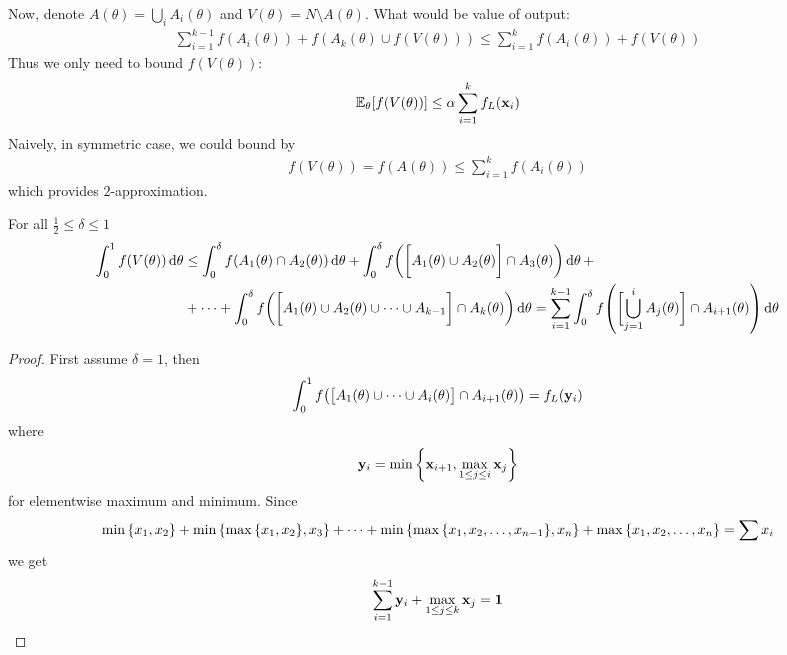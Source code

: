 Now, denote $A(\theta) = \bigcup_i A_i(\theta)$ and $V(\theta) = N \setminus A(\theta)$. What would be value of output:
\begin{align}
\sum_{i=1}^{k-1} f(A_i(\theta)) + f(A_k(\theta) \cup f(V(\theta))) \leq \sum_{i=1}^k f(A_i(\theta)) + f(V(\theta))
\end{align}
Thus we only need to bound $f(V(\theta))$:
\begin{align}
\mathbb{E}_\theta [f(V(\theta))] \leq \alpha \sum_{i=1}^{k} f_L(\vb{x}_i) 
\end{align}
Naively, in symmetric case, we could bound by
\begin{align}
f(V(\theta)) = f(A(\theta)) \leq \sum_{i=1}^{k} f(A_i(\theta))  
\end{align}
which provides $2$-approximation.
\begin{lemma}\label{th:delta_lemma}
	For all $\frac{1}{2} \leq \delta \leq 1$
	\begin{align}
	\int_0^1 f(V(\theta)) \dd{\theta} &\leq \int_0^\delta f(A_1(\theta) \cap A_2(\theta)) \dd{\theta} + \int_0^\delta f\qty(\qty\bigg[A_1(\theta) \cup A_2(\theta)] \cap A_3(\theta)) \dd{\theta} +\\&+ \dots + \int_0^\delta f\qty(\qty\bigg[A_1(\theta) \cup A_2(\theta) \cup \dots \cup A_{k-1}] \cap A_k(\theta)) \dd{\theta} = \sum_{i=1}^{k-1} \int_0^\delta f\qty(\qty\bigg[ \bigcup_{j=1}^{i} A_j(\theta)] \cap A_{i+1}(\theta)) \dd{\theta} 
	\end{align}
	\begin{proof}
		First assume $\delta=1$, then
		\begin{align}
		\int_0^1 f\qty(\qty\big[A_1(\theta) \cup \dots \cup A_{i}(\theta)] \cap A_{i+1}(\theta)) = f_L(\vb{y}_i)
		\end{align}
		where
		\begin{align}
		\vb{y}_i = \min \qty{\vb{x}_{i+1},\max\limits_{1\leq j \leq i} \vb{x}_j  }
		\end{align}
		for elementwise maximum and minimum. Since
		\begin{align}
		\min\qty{x_1, x_2} + \min\qty{\max\qty{x_1, x_2} , x_3} +\dots + \min\qty{\max\qty{x_1, x_2, \dots, x_{n-1}} , x_n} +\max\qty{x_1, x_2, \dots, x_{n}} = \sum x_i
		\end{align}
		we get
		\begin{align}
		\sum_{i=1}^{k-1} \vb{y}_i + \max\limits_{1\leq j \leq k} \vb{x}_j  = \vb{1}
		\end{align}
		

\end{proof}
\end{lemma}
